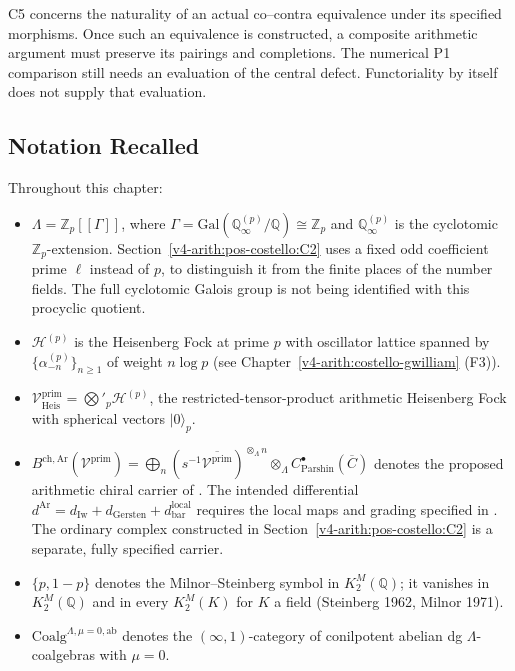 C5 concerns the naturality of an actual co--contra equivalence
under its specified morphisms. Once such an equivalence is
constructed, a composite arithmetic argument must preserve its
pairings and completions. The numerical P1 comparison still needs
an evaluation of the central defect. Functoriality by itself does
not supply that evaluation.

\subsection{Notation Recalled}

Throughout this chapter:
\begin{itemize}
\item \(\Lambda=\mathbb{Z}_{p}[[\Gamma]]\), where
\(\Gamma=\mathrm{Gal}(\mathbb Q_{\infty}^{(p)}/\mathbb Q)
\cong\mathbb Z_p\) and \(\mathbb Q_{\infty}^{(p)}\) is the
cyclotomic \(\mathbb Z_p\)-extension. Section~\ref{v4-arith:pos-costello:C2}
uses a fixed odd coefficient prime \(\ell\) instead of \(p\),
to distinguish it from the finite places of the number fields.
The full cyclotomic Galois group is not being identified with this
procyclic quotient.
\item \(\mathcal{H}^{(p)}\) is the Heisenberg Fock at prime \(p\)
with oscillator lattice spanned by \(\{\alpha_{-n}^{(p)}\}_{n\geq 1}\)
of weight \(n\log p\) (see Chapter~\ref{v4-arith:costello-gwilliam}
(F3)).
\item
\(\mathcal{V}^{\mathrm{prim}}_{\mathrm{Heis}}=\bigotimes'_{p}\mathcal{H}^{(p)}\),
the restricted-tensor-product arithmetic Heisenberg Fock with
spherical vectors \(|0\rangle_{p}\).
\item
\(B^{\mathrm{ch,Ar}}(\mathcal{V}^{\mathrm{prim}})=\bigoplus_{n}(s^{-1}\overline{\mathcal{V}^{\mathrm{prim}}})^{\otimes_{\Lambda}n}\otimes_{\Lambda}C^{\bullet}_{\mathrm{Parshin}}(\overline{C})\)
denotes the proposed arithmetic chiral carrier of
. The intended differential
\(d^{\mathrm{Ar}}=d_{\mathrm{Iw}}+d_{\mathrm{Gersten}}+d_{\mathrm{bar}}^{\mathrm{local}}\)
requires the local maps and grading specified in
. The ordinary complex
constructed in Section~\ref{v4-arith:pos-costello:C2} is a
separate, fully specified carrier.
\item \(\{p,1-p\}\) denotes the Milnor--Steinberg symbol in
\(K_{2}^{M}(\mathbb{Q})\); it vanishes in \(K_{2}^{M}(\mathbb{Q})\)
and in every \(K_{2}^{M}(K)\) for \(K\) a field (Steinberg 1962,
Milnor 1971).
\item
\(\mathrm{Coalg}^{\Lambda,\mu=0,\mathrm{ab}}\) denotes the
\((\infty,1)\)-category of conilpotent abelian dg
\(\Lambda\)-coalgebras with \(\mu=0\).
\end{itemize}

